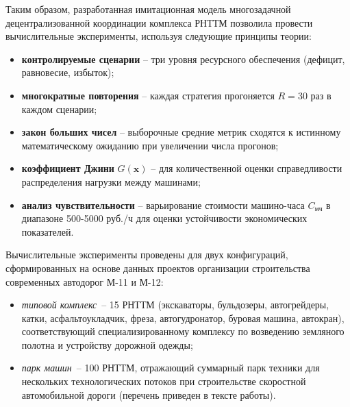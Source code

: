 Таким образом, разработанная имитационная модель многозадачной децентрализованной координации комплекса РНТТМ позволила провести вычислительные эксперименты, используя следующие принципы теории:
\begin{itemize}[beginpenalty=10000, midpenalty=10000, wide=\parindent, leftmargin=0pt]
    \item \textbf{контролируемые сценарии} -- три уровня ресурсного обеспечения (дефицит, равновесие, избыток);
    \item \textbf{многократные повторения} -- каждая стратегия прогоняется \( R = 30 \) раз в каждом сценарии;
    \item \textbf{закон больших чисел} -- выборочные средние метрик сходятся к истинному математическому ожиданию при увеличении числа прогонов;
    \item \textbf{коэффициент Джини} \( G(\mathbf{x}) \) -- для количественной оценки справедливости распределения нагрузки между машинами;
    \item \textbf{анализ чувствительности} -- варьирование стоимости машино-часа \( C_{\text{мч}} \) в диапазоне 500-5000 руб./ч для оценки устойчивости экономических показателей.
\end{itemize}

Вычислительные эксперименты проведены для двух конфигураций, сформированных на основе данных проектов организации строительства современных автодорог М-11 и М-12:
\begin{itemize}[beginpenalty=10000, midpenalty=10000, wide=\parindent, leftmargin=0pt]
    \item \textit{типовой комплекс}~-- 15 РНТТМ (экскаваторы, бульдозеры, автогрейдеры, катки, асфальтоукладчик, фреза, автогудронатор, буровая машина, автокран), соответствующий специализированному комплексу по возведению земляного полотна и устройству дорожной одежды;
    \item \textit{парк машин}~-- 100 РНТТМ, отражающий суммарный парк техники для нескольких технологических потоков при строительстве скоростной автомобильной дороги (перечень приведен в тексте работы).
\end{itemize}

